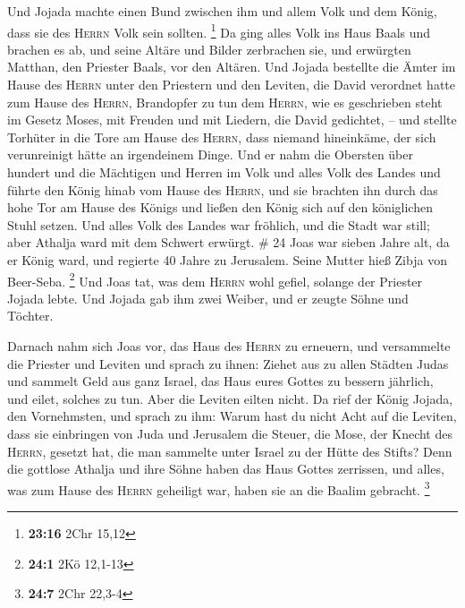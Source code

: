  Und Jojada machte einen Bund zwischen ihm und allem Volk
und dem König, dass sie des \textsc{Herrn} Volk sein sollten.
\footnote{\textbf{23:16} 2Chr 15,12}  Da ging alles Volk
ins Haus Baals und brachen es ab, und seine Altäre und Bilder zerbrachen
sie, und erwürgten Matthan, den Priester Baals, vor den Altären.
 Und Jojada bestellte die Ämter im Hause des
\textsc{Herrn} unter den Priestern und den Leviten, die David verordnet
hatte zum Hause des \textsc{Herrn}, Brandopfer zu tun dem
\textsc{Herrn}, wie es geschrieben steht im Gesetz Moses, mit Freuden
und mit Liedern, die David gedichtet, --  und stellte
Torhüter in die Tore am Hause des \textsc{Herrn}, dass niemand
hineinkäme, der sich verunreinigt hätte an irgendeinem Dinge.
 Und er nahm die Obersten über hundert und die Mächtigen
und Herren im Volk und alles Volk des Landes und führte den König hinab
vom Hause des \textsc{Herrn}, und sie brachten ihn durch das hohe Tor am
Hause des Königs und ließen den König sich auf den königlichen Stuhl
setzen.  Und alles Volk des Landes war fröhlich, und die
Stadt war still; aber Athalja ward mit dem Schwert erwürgt. \# 24
 Joas war sieben Jahre alt, da er König ward, und regierte
40 Jahre zu Jerusalem. Seine Mutter hieß Zibja von Beer-Seba.
\footnote{\textbf{24:1} 2Kö 12,1-13}  Und Joas tat, was
dem \textsc{Herrn} wohl gefiel, solange der Priester Jojada lebte.
 Und Jojada gab ihm zwei Weiber, und er zeugte Söhne und
Töchter.

 Darnach nahm sich Joas vor, das Haus des \textsc{Herrn}
zu erneuern,  und versammelte die Priester und Leviten und
sprach zu ihnen: Ziehet aus zu allen Städten Judas und sammelt Geld aus
ganz Israel, das Haus eures Gottes zu bessern jährlich, und eilet,
solches zu tun. Aber die Leviten eilten nicht.  Da rief
der König Jojada, den Vornehmsten, und sprach zu ihm: Warum hast du
nicht Acht auf die Leviten, dass sie einbringen von Juda und Jerusalem
die Steuer, die Mose, der Knecht des \textsc{Herrn}, gesetzt hat, die
man sammelte unter Israel zu der Hütte des Stifts?  Denn
die gottlose Athalja und ihre Söhne haben das Haus Gottes zerrissen, und
alles, was zum Hause des \textsc{Herrn} geheiligt war, haben sie an die
Baalim gebracht. \footnote{\textbf{24:7} 2Chr 22,3-4}

